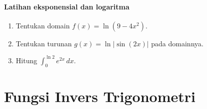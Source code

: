\documentclass{../../kalkulus-ppt}
\begin{document}
\begin{frame}{\insertsection}
    \framesubtitle{Latihan eksponensial dan logaritma}
    \begin{latihan}
        \begin{enumerate}
            \item Tentukan domain $f(x)=\ln(9-4x^2)$.
            \item Tentukan turunan $g(x)=\ln|\sin(2x)|$ pada domainnya.
            \item Hitung $\displaystyle\int_0^{\ln 2} e^{2x}\,dx$.
        \end{enumerate}
    \end{latihan}
\end{frame}

\section{Fungsi Invers Trigonometri}
\end{document}
